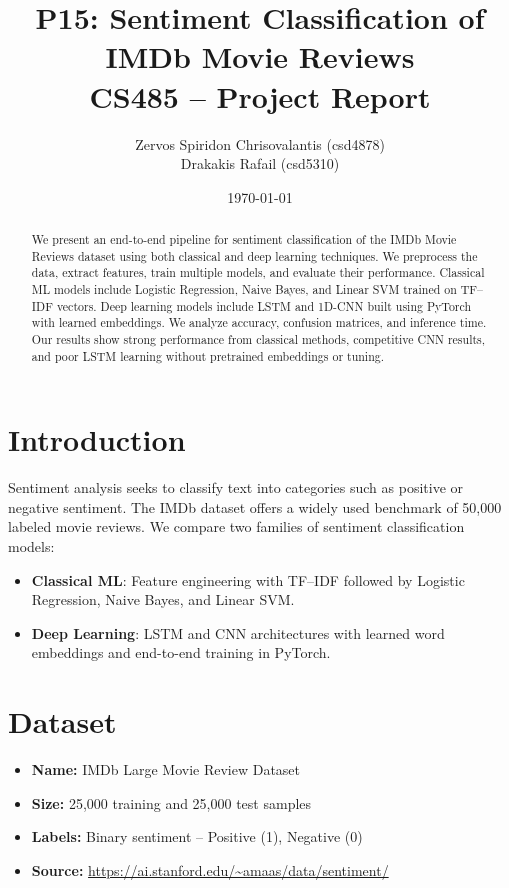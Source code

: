 \documentclass[12pt,a4paper]{article}
\title{%
  \textbf{P15: Sentiment Classification of IMDb Movie Reviews}\\
  \vspace{0.5em}
  \large CS485 -- Project Report
}
\author{%
  Zervos Spiridon Chrisovalantis (csd4878) \\
  Drakakis Rafail (csd5310)
}
\date{\today}
\begin{document}
\maketitle
\thispagestyle{empty}

\begin{abstract}
  We present an end-to-end pipeline for sentiment classification of the IMDb Movie Reviews dataset using both classical and deep learning techniques. We preprocess the data, extract features, train multiple models, and evaluate their performance. Classical ML models include Logistic Regression, Naive Bayes, and Linear SVM trained on TF–IDF vectors. Deep learning models include LSTM and 1D-CNN built using PyTorch with learned embeddings. We analyze accuracy, confusion matrices, and inference time. Our results show strong performance from classical methods, competitive CNN results, and poor LSTM learning without pretrained embeddings or tuning.
\end{abstract}

\newpage
\tableofcontents
\newpage

\section{Introduction}
Sentiment analysis seeks to classify text into categories such as positive or negative sentiment. The IMDb dataset offers a widely used benchmark of 50,000 labeled movie reviews. We compare two families of sentiment classification models:
\begin{itemize}
  \item \textbf{Classical ML}: Feature engineering with TF–IDF followed by Logistic Regression, Naive Bayes, and Linear SVM.
  \item \textbf{Deep Learning}: LSTM and CNN architectures with learned word embeddings and end-to-end training in PyTorch.
\end{itemize}

\section{Dataset}
\begin{itemize}
  \item \textbf{Name:} IMDb Large Movie Review Dataset
  \item \textbf{Size:} 25,000 training and 25,000 test samples
  \item \textbf{Labels:} Binary sentiment – Positive (1), Negative (0)
  \item \textbf{Source:} \url{https://ai.stanford.edu/~amaas/data/sentiment/}
\end{itemize}
\end{document}
